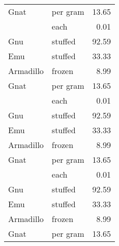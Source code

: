 {
\setlength{\extrarowheight}{1pt}
\large
\sffamily
{}

\tablelasttail{}
\begin{center}
\begin{xtabular}{llr}
Gnat                            & per gram & 13.65 \\
          & each     & 0.01  \\
Gnu                             & stuffed  & 92.59 \\
Emu       & stuffed  & 33.33 \\
Armadillo                       & frozen   & 8.99  \\
Gnat      & per gram & 13.65 \\
                                & each     & 0.01  \\
Gnu       & stuffed  & 92.59 \\
Emu                             & stuffed  & 33.33 \\
Armadillo & frozen   & 8.99  \\
Gnat                            & per gram & 13.65 \\
          & each     & 0.01  \\
Gnu                             & stuffed  & 92.59 \\
Emu       & stuffed  & 33.33 \\
Armadillo                       & frozen   & 8.99  \\
Gnat      & per gram & 13.65 \\

\end{xtabular}
\end{center}}

